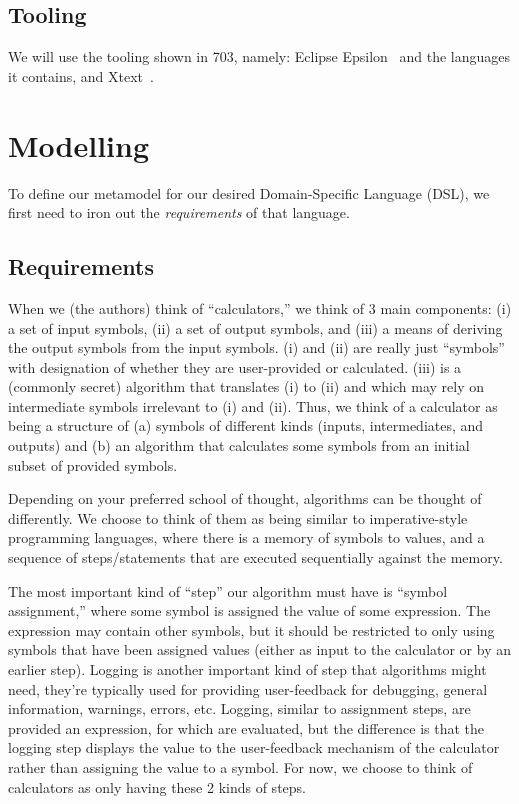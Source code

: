 \documentclass[11pt,fleqn]{article}
\begin{document}
\subsection{Tooling}
\label{sec:introduction:subsec:tooling}

We will use the tooling shown in 703, namely: Eclipse Epsilon~\cite{Epsilon} and
the languages it contains, and Xtext~\cite{Xtext}.

\newpage{}

\section{Modelling}
\label{sec:modelling}

To define our metamodel for our desired Domain-Specific Language (DSL), we first
need to iron out the \textit{requirements} of that language.

\subsection{Requirements}
\label{sec:modelling:subsec:requirements}

When we (the authors) think of ``calculators,'' we think of 3 main components:
(i) a set of input symbols, (ii) a set of output symbols, and (iii) a means of
deriving the output symbols from the input symbols. (i) and (ii) are really just
``symbols'' with designation of whether they are user-provided or calculated.
(iii) is a (commonly secret) algorithm that translates (i) to (ii) and which may
rely on intermediate symbols irrelevant to (i) and (ii). Thus, we think of a
calculator as being a structure of (a) symbols of different kinds (inputs,
intermediates, and outputs) and (b) an algorithm that calculates some symbols
from an initial subset of provided symbols.

Depending on your preferred school of thought, algorithms can be thought of
differently. We choose to think of them as being similar to imperative-style
programming languages, where there is a memory of symbols to values, and a
sequence of steps/statements that are executed sequentially against the memory.

The most important kind of ``step'' our algorithm must have is ``symbol
assignment,'' where some symbol is assigned the value of some expression. The
expression may contain other symbols, but it should be restricted to only using
symbols that have been assigned values (either as input to the calculator or by
an earlier step). Logging is another important kind of step that algorithms
might need, they're typically used for providing user-feedback for debugging,
general information, warnings, errors, etc. Logging, similar to assignment
steps, are provided an expression, for which are evaluated, but the difference
is that the logging step displays the value to the user-feedback mechanism of
the calculator rather than assigning the value to a symbol. For now, we choose
to think of calculators as only having these 2 kinds of steps.
\end{document}
